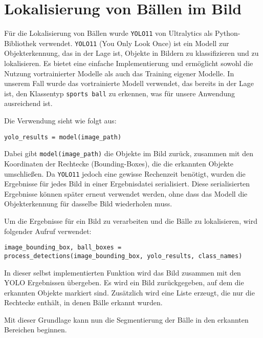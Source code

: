 \section{Lokalisierung von Bällen im Bild}

Für die Lokalisierung von Bällen wurde \texttt{YOLO11} von Ultralytics als Python-Bibliothek verwendet. \texttt{YOLO11} (You Only Look Once) ist ein Modell zur Objekterkennung, das in der Lage ist, Objekte in Bildern zu klassifizieren und zu lokalisieren. Es bietet eine einfache Implementierung und ermöglicht sowohl die Nutzung vortrainierter Modelle als auch das Training eigener Modelle. In unserem Fall wurde das vortrainierte Modell verwendet, das bereits in der Lage ist, den Klassentyp \texttt{sports ball} zu erkennen, was für unsere Anwendung ausreichend ist.

Die Verwendung sieht wie folgt aus:

\begin{verbatim}
yolo_results = model(image_path)
\end{verbatim}

Dabei gibt \texttt{model(image\_path)} die Objekte im Bild zurück, zusammen mit den Koordinaten der Rechtecke (Bounding-Boxes), die die erkannten Objekte umschließen. Da \texttt{YOLO11} jedoch eine gewisse Rechenzeit benötigt, wurden die Ergebnisse für jedes Bild in einer Ergebnisdatei serialisiert. Diese serialisierten Ergebnisse können später erneut verwendet werden, ohne dass das Modell die Objekterkennung für dasselbe Bild wiederholen muss.

Um die Ergebnisse für ein Bild zu verarbeiten und die Bälle zu lokalisieren, wird folgender Aufruf verwendet:

\begin{verbatim}
image_bounding_box, ball_boxes = process_detections(image_bounding_box, yolo_results, class_names)
\end{verbatim}

In dieser selbst implementierten Funktion wird das Bild zusammen mit den YOLO Ergebnissen übergeben. Es wird ein Bild zurückgegeben, auf dem die erkannten Objekte markiert sind. Zusätzlich wird eine Liste erzeugt, die nur die Rechtecke enthält, in denen Bälle erkannt wurden.

Mit dieser Grundlage kann nun die Segmentierung der Bälle in den erkannten Bereichen beginnen.
